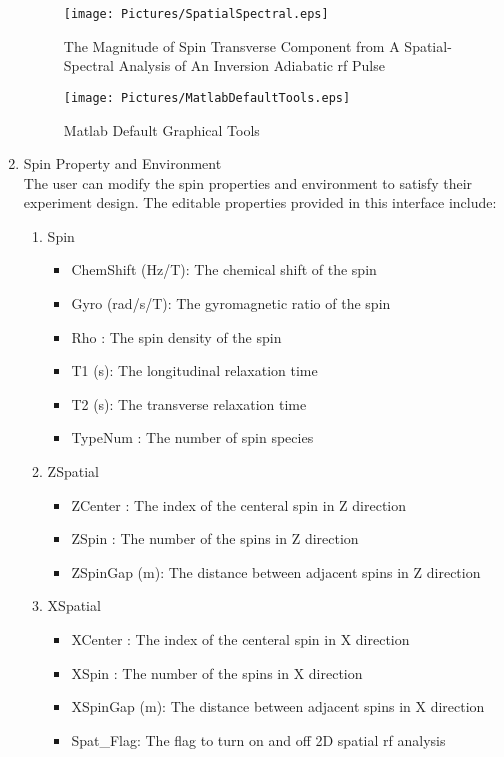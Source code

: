 \documentclass{book}%
\begin{document}
\begin{enumerate}
\begin{figure}[htbp]
	\centering
		\texttt{[image: Pictures/SpatialSpectral.eps]}
	\caption{The Magnitude of Spin Transverse Component from A Spatial-Spectral Analysis of An Inversion Adiabatic rf Pulse}
	\label{fig:SpatialSpectral}
\end{figure}

\begin{figure}[htbp]
	\centering
		\texttt{[image: Pictures/MatlabDefaultTools.eps]}
	\caption{Matlab Default Graphical Tools}
	\label{fig:MatlabDefaultTools}
\end{figure}

\item Spin Property and Environment \\

The user can modify the spin properties and environment to satisfy their experiment design. The editable properties provided in this interface include:

\begin{enumerate}

\item Spin
\begin{itemize}
	\item ChemShift (Hz/T): The chemical shift of the spin
	\item Gyro (rad/s/T): The gyromagnetic ratio of the spin
	\item Rho : The spin density of the spin
	\item T1 (s): The longitudinal relaxation time
	\item T2 (s): The transverse relaxation time
	\item TypeNum : The number of spin species
\end{itemize}

\item ZSpatial \label{it:ZSpatial}
\begin{itemize}
	\item ZCenter : The index of the centeral spin in Z direction
	\item ZSpin : The number of the spins in Z direction
	\item ZSpinGap (m): The distance between adjacent spins in Z direction
\end{itemize}

\item XSpatial \label{it:XSpatial}

\begin{itemize}
	\item XCenter : The index of the centeral spin in X direction
	\item XSpin : The number of the spins in X direction
	\item XSpinGap (m): The distance between adjacent spins in X direction
	\item Spat\_Flag: The flag to turn on and off 2D spatial rf analysis
\end{itemize}


\end{enumerate}
\end{enumerate}
\end{document}

